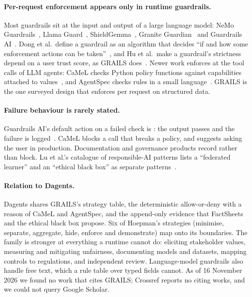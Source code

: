 \paragraph{Per-request enforcement appears only in runtime guardrails.} Most
guardrails sit at the input and output of a large language model: NeMo
Guardrails~\citep{rebedea2023nemo}, Llama Guard~\citep{inan2023llama},
ShieldGemma~\citep{zeng2024shieldgemma}, Granite Guardian~\citep{padhi2024granite}
and Guardrails AI~\citep{guardrailsai2026onfail}. Dong et al.\ define a
guardrail as an algorithm that decides ``if and how some enforcement actions can
be taken''~\citep{dong2024building}, and Hu et al.\ make a guardrail's
strictness depend on a user trust score, as GRAILS does~\citep{hu2024trust}.
Newer work enforces at the tool calls of LLM agents: CaMeL checks Python policy
functions against capabilities attached to values~\citep{debenedetti2026defeating},
and AgentSpec checks rules in a small language~\citep{wang2026agentspec}.
GRAILS is the one surveyed design that enforces per request on structured data.

\paragraph{Failure behaviour is rarely stated.} Guardrails AI's default action
on a failed check is : the output passes and the failure is
logged~\citep{guardrailsai2026onfail}. CaMeL blocks a call that breaks a policy,
and suggests asking the user in production. Documentation and governance
products record rather than block. Lu et al.'s catalogue of responsible-AI
patterns lists a ``federated learner'' and an ``ethical black box'' as separate
patterns~\citep{lu2024responsible}.

\paragraph{Relation to Dagents.} Dagents shares GRAILS's strategy table, the
deterministic allow-or-deny with a reason of CaMeL and AgentSpec, and the
append-only evidence that FactSheets and the ethical black box propose. Six of
Hoepman's strategies (minimise, separate, aggregate, hide, enforce and
demonstrate) map onto its boundaries. The family is stronger at everything a
runtime cannot do: eliciting stakeholder values, measuring and mitigating
unfairness, documenting models and datasets, mapping controls to regulations,
and independent review. Language-model guardrails also handle free text, which
a rule table over typed fields cannot. As of 16 November 2026 we found no work
that cites GRAILS; Crossref reports no citing works, and we could not query
Google Scholar.
